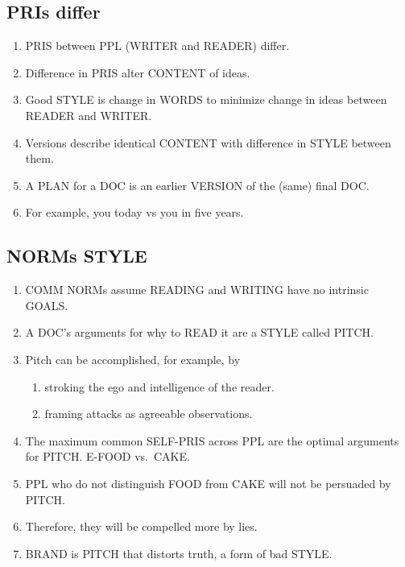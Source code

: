 \documentclass[
]{book}
\providecommand{\tightlist}{%
  \setlength{\itemsep}{0pt}\setlength{\parskip}{0pt}}
\begin{document}
\hypertarget{pris-differ}{%
\subsection{PRIs differ}\label{pris-differ}}

\begin{enumerate}
\def\labelenumi{\arabic{enumi}.}
\setcounter{enumi}{57}
\tightlist
\item
  PRIS between PPL (WRITER and READER) differ.
\item
  Difference in PRIS alter CONTENT of ideas.
\item
  Good STYLE is change in WORDS to minimize change in ideas between
  READER and WRITER.
\item
  Versions describe identical CONTENT with difference in STYLE between
  them.
\item
  A PLAN for a DOC is an earlier VERSION of the (same) final DOC.
\item
  For example, you today vs you in five years.
\end{enumerate}

\hypertarget{norms-style}{%
\subsection{NORMs STYLE}\label{norms-style}}

\begin{enumerate}
\def\labelenumi{\arabic{enumi}.}
\setcounter{enumi}{63}
\tightlist
\item
  COMM NORMs assume READING and WRITING have no intrinsic GOALS.
\item
  A DOC's arguments for why to READ it are a STYLE called PITCH.
\item
  Pitch can be accomplished, for example, by

  \begin{enumerate}
  \def\labelenumii{\arabic{enumii}.}
  \tightlist
  \item
    stroking the ego and intelligence of the reader.
  \item
    framing attacks as agreeable observations.
  \end{enumerate}
\item
  The maximum common SELF-PRIS across PPL are the optimal
  arguments for PITCH. E-FOOD vs.~CAKE.
\item
  PPL who do not distinguish FOOD from CAKE will not be persuaded by
  PITCH.
\item
  Therefore, they will be compelled more by lies.
\item
  BRAND is PITCH that distorts truth, a form of bad STYLE.
\end{enumerate}
\end{document}
